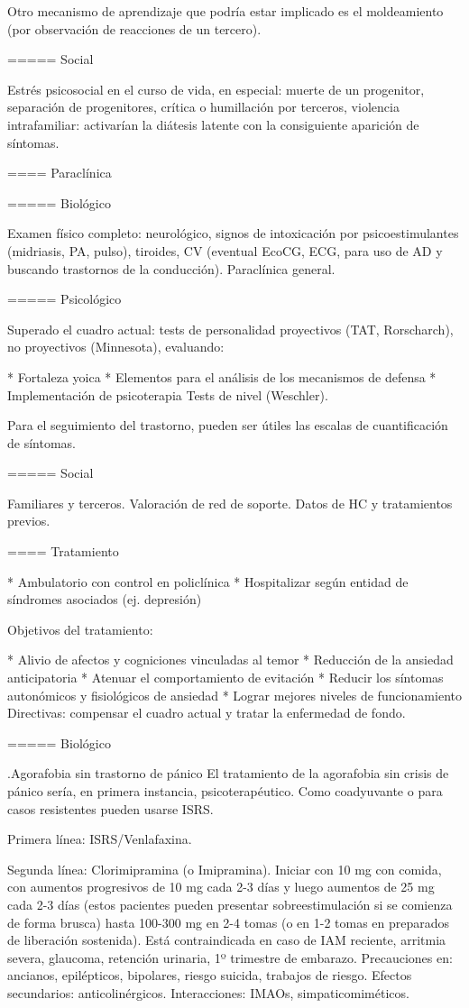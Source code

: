 \begin{itemize}
Otro mecanismo de aprendizaje que podría estar implicado es el moldeamiento (por observación de reacciones de un tercero).

===== Social

Estrés psicosocial en el curso de vida, en especial: muerte de un progenitor, separación de progenitores, crítica o humillación por terceros, violencia intrafamiliar: activarían la diátesis latente con la consiguiente aparición de síntomas.

==== Paraclínica

===== Biológico

Examen físico completo: neurológico, signos de intoxicación por psicoestimulantes (midriasis, PA, pulso), tiroides, CV (eventual EcoCG, ECG, para uso de AD y buscando trastornos de la conducción). Paraclínica general.

===== Psicológico

Superado el cuadro actual: tests de personalidad proyectivos (TAT, Rorscharch), no proyectivos (Minnesota), evaluando:

* Fortaleza yoica
* Elementos para el análisis de los mecanismos de defensa
* Implementación de psicoterapia Tests de nivel (Weschler).

Para el seguimiento del trastorno, pueden ser útiles las escalas de cuantificación de síntomas.

===== Social

Familiares y terceros. Valoración de red de soporte. Datos de HC y tratamientos previos.

==== Tratamiento

* Ambulatorio con control en policlínica
* Hospitalizar según entidad de síndromes asociados (ej. depresión)

Objetivos del tratamiento:

* Alivio de afectos y cogniciones vinculadas al temor
* Reducción de la ansiedad anticipatoria
* Atenuar el comportamiento de evitación
* Reducir los síntomas autonómicos y fisiológicos de ansiedad
* Lograr mejores niveles de funcionamiento Directivas: compensar el cuadro actual y tratar la enfermedad de fondo.

===== Biológico

.Agorafobia sin trastorno de pánico
El tratamiento de la agorafobia sin crisis de pánico sería, en primera instancia, psicoterapéutico. Como coadyuvante o para casos resistentes pueden usarse ISRS.

Primera línea: ISRS/Venlafaxina.

Segunda línea: Clorimipramina (o Imipramina). Iniciar con 10 mg con comida, con aumentos progresivos de 10 mg cada 2-3 días y luego aumentos de 25 mg cada 2-3 días (estos pacientes pueden presentar sobreestimulación si se comienza de forma brusca) hasta 100-300 mg en 2-4 tomas (o en 1-2 tomas en preparados de liberación sostenida). Está contraindicada en caso de IAM reciente, arritmia severa, glaucoma, retención urinaria, 1º trimestre de embarazo. Precauciones en: ancianos, epilépticos, bipolares, riesgo suicida, trabajos de riesgo. Efectos secundarios: anticolinérgicos. Interacciones: IMAOs, simpaticomiméticos.


\end{itemize}
